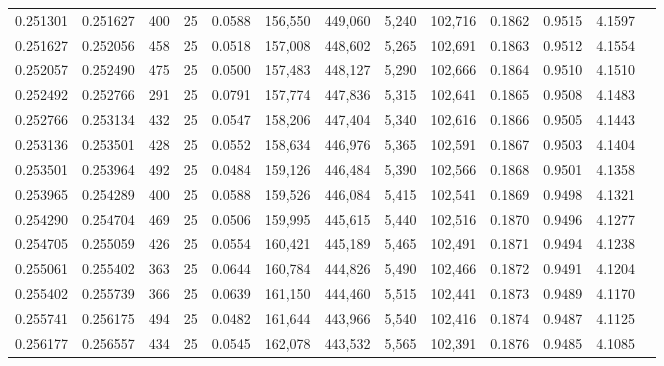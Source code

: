 \begin{tabular}{rrrrrrrrrrrrr}
0.251301 & 0.251627 &   400 &  25 &                                     0.0588 & 156,550 & 449,060 &   5,240 & 102,716 & 0.1862 & 0.9515 & 4.1597 \\
0.251627 & 0.252056 &   458 &  25 &                                     0.0518 & 157,008 & 448,602 &   5,265 & 102,691 & 0.1863 & 0.9512 & 4.1554 \\
0.252057 & 0.252490 &   475 &  25 &                                     0.0500 & 157,483 & 448,127 &   5,290 & 102,666 & 0.1864 & 0.9510 & 4.1510 \\
0.252492 & 0.252766 &   291 &  25 &                                     0.0791 & 157,774 & 447,836 &   5,315 & 102,641 & 0.1865 & 0.9508 & 4.1483 \\
0.252766 & 0.253134 &   432 &  25 &                                     0.0547 & 158,206 & 447,404 &   5,340 & 102,616 & 0.1866 & 0.9505 & 4.1443 \\
0.253136 & 0.253501 &   428 &  25 &                                     0.0552 & 158,634 & 446,976 &   5,365 & 102,591 & 0.1867 & 0.9503 & 4.1404 \\
0.253501 & 0.253964 &   492 &  25 &                                     0.0484 & 159,126 & 446,484 &   5,390 & 102,566 & 0.1868 & 0.9501 & 4.1358 \\
0.253965 & 0.254289 &   400 &  25 &                                     0.0588 & 159,526 & 446,084 &   5,415 & 102,541 & 0.1869 & 0.9498 & 4.1321 \\
0.254290 & 0.254704 &   469 &  25 &                                     0.0506 & 159,995 & 445,615 &   5,440 & 102,516 & 0.1870 & 0.9496 & 4.1277 \\
0.254705 & 0.255059 &   426 &  25 &                                     0.0554 & 160,421 & 445,189 &   5,465 & 102,491 & 0.1871 & 0.9494 & 4.1238 \\
0.255061 & 0.255402 &   363 &  25 &                                     0.0644 & 160,784 & 444,826 &   5,490 & 102,466 & 0.1872 & 0.9491 & 4.1204 \\
0.255402 & 0.255739 &   366 &  25 &                                     0.0639 & 161,150 & 444,460 &   5,515 & 102,441 & 0.1873 & 0.9489 & 4.1170 \\
0.255741 & 0.256175 &   494 &  25 &                                     0.0482 & 161,644 & 443,966 &   5,540 & 102,416 & 0.1874 & 0.9487 & 4.1125 \\
0.256177 & 0.256557 &   434 &  25 &                                     0.0545 & 162,078 & 443,532 &   5,565 & 102,391 & 0.1876 & 0.9485 & 4.1085 \\

\end{tabular}
